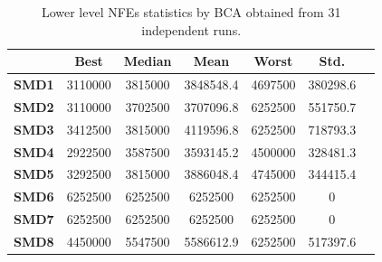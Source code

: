 \documentclass[conference]{IEEEtran}
\begin{document}
\begin{table}[!ht]
\renewcommand{\arraystretch}{1.3}
    \caption{Lower level NFEs statistics by BCA obtained from 31 independent runs.}
    \label{tab:ll-fes}
    \centering
    \begin{tabular}{|c|c|c|c|c|c|c|}
\hline
&\textbf{Best}&\textbf{Median}&\textbf{Mean}&\textbf{Worst}&\textbf{Std.}\\ \hline 
\textbf{SMD1} & 3110000  & 3815000  & 3848548.4  & 4697500  & 380298.6 \\ \hline
\textbf{SMD2} & 3110000  & 3702500  & 3707096.8  & 6252500  & 551750.7 \\ \hline
\textbf{SMD3} & 3412500  & 3815000  & 4119596.8  & 6252500  & 718793.3 \\ \hline
\textbf{SMD4} & 2922500  & 3587500  & 3593145.2  & 4500000  & 328481.3 \\ \hline
\textbf{SMD5} & 3292500  & 3815000  & 3886048.4  & 4745000  & 344415.4 \\ \hline
\textbf{SMD6} & 6252500  & 6252500  & 6252500  & 6252500  & 0 \\ \hline
\textbf{SMD7} & 6252500  & 6252500  & 6252500  & 6252500  & 0 \\ \hline
\textbf{SMD8} & 4450000  & 5547500  & 5586612.9  & 6252500  & 517397.6 \\ \hline
    \end{tabular}
\end{table}

\end{document}
